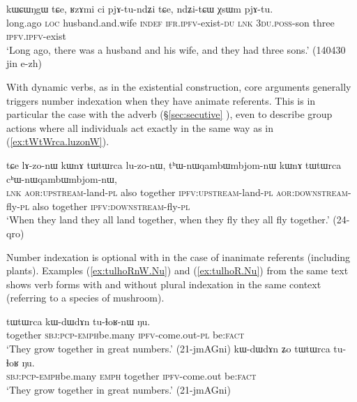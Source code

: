 \begin{exe}
\ex \label{ex:pjAtundZi.pjAtu}
\gll kɯɕɯŋgɯ tɕe, ʁzɤmi ci pjɤ-tu-ndʑi tɕe, ndʑi-tɕɯ χsɯm pjɤ-tu. \\
long.ago \textsc{loc} husband.and.wife \textsc{indef} \textsc{ifr}.\textsc{ipfv}-exist-\textsc{du} \textsc{lnk} \textsc{3du}.\textsc{poss}-son three \textsc{ipfv}.\textsc{ipfv}-exist \\
\glt `Long ago, there was a husband and his wife, and they had three sons.' (140430 jin e-zh)
\end{exe}

With dynamic verbs, as in the existential construction, core arguments generally triggers number indexation when they have animate referents. This is in particular the case with the adverb  (§\ref{sec:secutive} ), even to describe group actions where all individuals act exactly in the same way as in (\ref{ex:tWtWrca.luzonW}).

\begin{exe}
\ex \label{ex:tWtWrca.luzonW}
\gll tɕe lɤ-zo-nɯ kɯnɤ tɯtɯrca lu-zo-nɯ, tʰɯ-nɯqambɯmbjom-nɯ kɯnɤ tɯtɯrca cʰɯ-nɯqambɯmbjom-nɯ, \\
\textsc{lnk} \textsc{aor}:\textsc{upstream}-land-\textsc{pl}  also  together  \textsc{ipfv}:\textsc{upstream}-land-\textsc{pl} \textsc{aor}:\textsc{downstream}-fly-\textsc{pl}  also together  \textsc{ipfv}:\textsc{downstream}-fly-\textsc{pl} \\
\glt `When they land they all land together, when they fly they all fly together.' (24-qro)
\end{exe}

Number indexation is optional with  in the case of inanimate referents (including plants). Examples (\ref{ex:tulhoRnW.Nu}) and (\ref{ex:tulhoR.Nu}) from the same text shows verb forms with and without plural indexation in the same context (referring to a species of mushroom).

\begin{exe}
\ex 
\begin{xlist}
\ex \label{ex:tulhoRnW.Nu}
\gll tɯtɯrca kɯ-dɯ\redp{}dɤn tu-ɬoʁ-nɯ ŋu. \\
together \textsc{sbj}:\textsc{pcp}-\textsc{emph}\redp{}be.many \textsc{ipfv}-come.out-\textsc{pl} be:\textsc{fact} \\
\glt `They grow together in great numbers.' (21-jmAGni) 
\ex \label{ex:tulhoR.Nu}
\gll kɯ-dɯ\redp{}dɤn ʑo tɯtɯrca tu-ɬoʁ ŋu. \\
 \textsc{sbj}:\textsc{pcp}-\textsc{emph}\redp{}be.many \textsc{emph} together \textsc{ipfv}-come.out be:\textsc{fact} \\
\glt `They grow together in great numbers.'  (21-jmAGni) 	
\end{xlist}
\end{exe}


